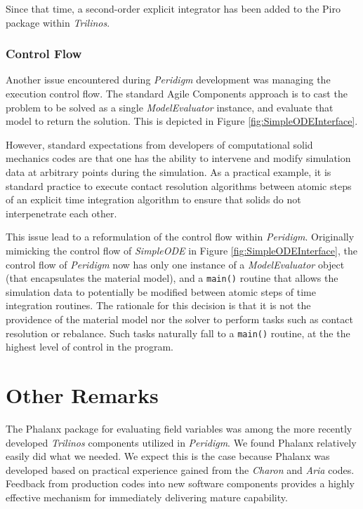\documentclass[pdf,ps2pdf,12pt,report]{SANDreport}
\theoremstyle{plain}
\theoremstyle{definition}
\theoremstyle{remark}
\numberwithin{equation}{section}
\begin{document}
Since that time, a second-order explicit integrator has been added to the Piro package within \emph{Trilinos}.

\subsubsection{Control Flow}

Another issue encountered during \emph{Peridigm} development was managing the execution control flow. The standard Agile Components approach is to cast the problem to be solved as a single \emph{ModelEvaluator} instance, and evaluate that model to return the solution. This is depicted in Figure \ref{fig:SimpleODEInterface}.

However, standard expectations from developers of computational solid mechanics codes are that one has the ability to intervene and modify simulation data at arbitrary points during the simulation. As a practical example, it is standard practice to execute contact resolution algorithms between atomic steps of an explicit time integration algorithm to ensure that solids do not interpenetrate each other.

This issue lead to a reformulation of the control flow within \emph{Peridigm}. Originally mimicking the control flow of \emph{SimpleODE} in Figure \ref{fig:SimpleODEInterface}, the control flow of \emph{Peridigm} now has only one instance of a \emph{ModelEvaluator} object (that encapsulates the material model), and a \verb"main()" routine that allows the simulation data to potentially be modified between atomic steps of time integration routines. The rationale for this decision is that it is not the providence of the material model nor the solver to perform tasks such as contact resolution or rebalance. Such tasks naturally fall to a \verb"main()" routine, at the the highest level of control in the program.

\section{Other Remarks}

The Phalanx package \cite{PhalanxWebPage:2011} for evaluating field variables was among the more recently developed \emph{Trilinos} components utilized in \emph{Peridigm}. We found Phalanx relatively easily did what we needed. We expect this is the case because Phalanx was developed based on practical experience gained from the \emph{Charon} and \emph{Aria} codes. Feedback from production codes into new software components provides a highly effective mechanism for immediately delivering mature capability.
\end{document}
